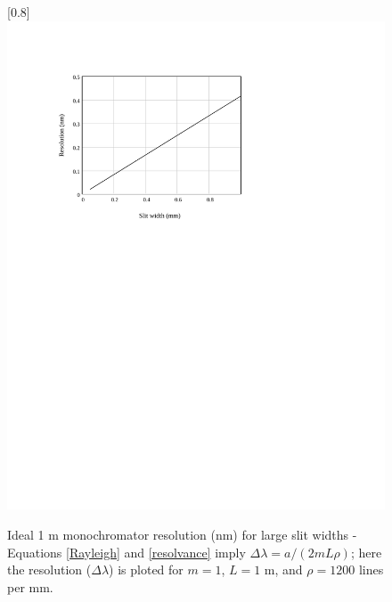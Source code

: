 \begin{figure}
\scalebox{0.8}[0.8]{
\includegraphics[bb=-30 478 489 700]
{far_nm/far_nm.pdf}
}
\caption[Ideal 1 m monochromator resolution (nm) for large slit widths]{Ideal 1 m monochromator resolution (nm) for large slit widths - Equations \ref{Rayleigh} and \ref{resolvance} imply $\Delta\lambda = a/(2mL\rho)$; here the resolution ($\Delta\lambda$) is ploted for $m=1$, $L=1$ m, and $\rho=1200$ lines per mm.}
\label{far_nm}
\end{figure}
